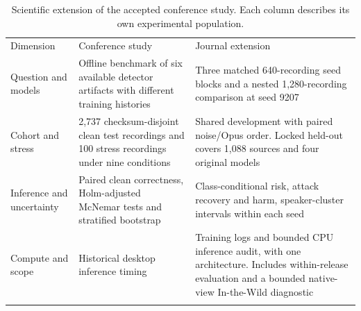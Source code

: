 \begin{table}[t]
\centering
\small
\caption{Scientific extension of the accepted conference study. Each column describes its own experimental population.}\label{tab:conference-extension}
\begin{tabular}{@{}p{.20\linewidth}p{.35\linewidth}p{.36\linewidth}@{}}
\toprule
Dimension & Conference study & Journal extension \\
\colrule
Question and models & Offline benchmark of six available detector artifacts with different training histories & Three matched 640-recording seed blocks and a nested 1,280-recording comparison at seed 9207 \\
Cohort and stress & 2,737 checksum-disjoint clean test recordings and 100 stress recordings under nine conditions & Shared development with paired noise/Opus order. Locked held-out covers 1,088 sources and four original models \\
Inference and uncertainty & Paired clean correctness, Holm-adjusted McNemar tests and stratified bootstrap & Class-conditional risk, attack recovery and harm, speaker-cluster intervals within each seed \\
Compute and scope & Historical desktop inference timing & Training logs and bounded CPU inference audit, with one architecture. Includes within-release evaluation and a bounded native-view In-the-Wild diagnostic \\
\botrule
\end{tabular}
\end{table}
